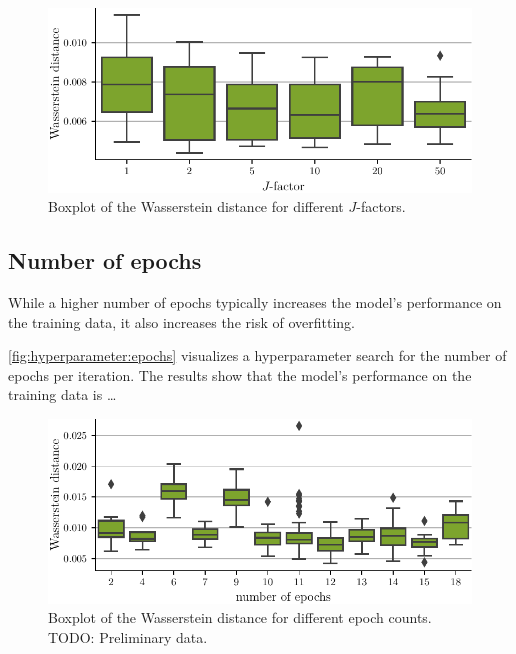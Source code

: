 \begin{figure}
  \centering
  \includegraphics[scale=1]{content/plots/hyperparam/J_factor_vs_wd_boxplot_lessheight.pdf}
  \caption{Boxplot of the Wasserstein distance for different $J$-factors.}
  \label{fig:hyperparameter:J}
\end{figure}


\subsection{Number of epochs}
While a higher number of epochs typically increases the model's performance on the training data,
it also increases the risk of overfitting.

\autoref{fig:hyperparameter:epochs} visualizes a hyperparameter search for the number of epochs per \dsea{} iteration.
The results show that the model's performance on the training data is …

\begin{figure}
  \centering
  \includegraphics[width=\textwidth]{content/plots/hyperparam/num_epochs_vs_wd_boxplot_lessheight.pdf}
  \caption{Boxplot of the Wasserstein distance for different epoch counts. TODO: Preliminary data.}
  \label{fig:hyperparameter:epochs}
\end{figure}

